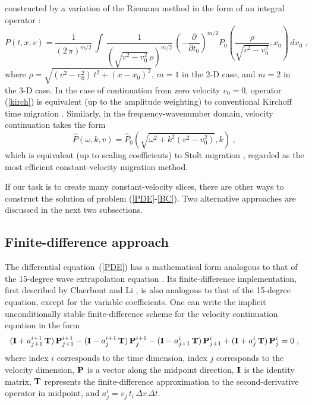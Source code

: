 constructed by a variation of the Riemann method in the form of an
integral operator \cite[]{me,first}:
\begin{equation}
  \label{kirch}
  P(t,x,v) = \frac{1}{(2\,\pi)^{m/2}}\,\int\, 
  \frac{1}{(\sqrt{v^2-v_0^2}\,\rho)^{m/2}}\, 
  \left(- \frac{\partial}{\partial t_0}\right)^{m/2}
  P_0\left(\frac{\rho}{\sqrt{v^2-v_0^2}},x_0\right)\,dx_0\;,
\end{equation}
where $\rho = \sqrt{(v^2-v_0^2)\,t^2 + (x - x_0)^2}$, $m=1$ in the 2-D
case, and $m=2$ in the 3-D case. In the case of continuation from zero
velocity $v_0=0$, operator (\ref{kirch}) is equivalent (up to the
amplitude weighting) to conventional Kirchoff time migration
\cite[]{GEO43-01-00490076}.  Similarly, in the frequency-wavenumber
domain, velocity continuation takes the form
\begin{equation}
  \label{stolt}
  \hat{P} (\omega,k,v) = \hat{P}_0 (\sqrt{\omega^2+k^2 (v^2-v_0^2)},k)\;,
\end{equation}
which is equivalent (up to scaling coefficients) to Stolt migration
\cite[]{GEO43-01-00230048}, regarded as the most efficient constant-velocity
migration method.
\par
If our task is to create many constant-velocity slices, there are
other ways to construct the solution of problem (\ref{PDE}-\ref{BC}).
Two alternative approaches are discussed in the next two
subsections.
\subsection{Finite-difference approach}
The differential equation~(\ref{PDE}) has a mathematical form analogous to
that of the 15-degree wave extrapolation equation
\cite[]{Claerbout.blackwell.76}. Its finite-difference implementation, first
described by Claerbout  and Li
, is also analogous to that of the 15-degree equation,
except for the variable coefficients. One can write the implicit
unconditionally stable finite-difference scheme for the velocity continuation
equation in the form
\begin{equation}
({\bf I} + a_{j+1}^{i+1}\,{\bf T})\,{\bf P}_{j+1}^{i+1} - 
({\bf I} - a_{j}^{i+1}\,{\bf T})\,{\bf P}_{j}^{i+1} -
({\bf I} - a_{j+1}^{i}\,{\bf T})\,{\bf P}_{j+1}^{i} + 
({\bf I} + a_{j}^{i}\,{\bf T})\,{\bf P}_{j}^{i} = 0\;, 
\label{eqn:fds} 
\end{equation}
where index $i$ corresponds to the time dimension, index $j$
corresponds to the velocity dimension, ${\bf P}$ is a vector along the
midpoint direction, ${\bf I}$ is the identity matrix, ${\bf T}$
represents the finite-difference approximation to the 
second-derivative operator in midpoint,
and $a_{j}^{i} = v_j\,t_i\,{\Delta v\,\Delta t}$.

